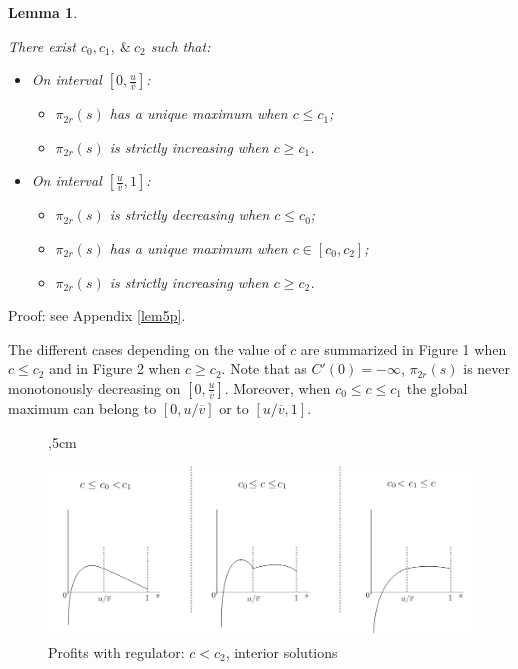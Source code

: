 \documentclass[a4paper,leqno]{article}%
\newtheorem{lemma}{Lemma}
\newcommand{\ov}{\overline{v}}
\begin{document}
\begin{lemma}~~\label{lem7}

There exist $c_0,c_1,~\&~c_2$ such that:

\begin{itemize}
    \item On interval $[0,\frac{u}{\ov}]$:
    \begin{itemize}
        \item $\pi_{2r}(s)$ has a unique maximum when $c\leq c_1$;
        \item $\pi_{2r}(s)$ is strictly increasing when $c\geq c_1$.
    \end{itemize}
    \item On interval $[\frac{u}{\ov},1]$:
    \begin{itemize}
        \item $\pi_{2r}(s)$ is strictly decreasing when $c\leq c_0$;
        \item $\pi_{2r}(s)$ has a unique maximum when $c\in[c_0,c_2]$;
        \item $\pi_{2r}(s)$ is strictly increasing when $c\geq c_2$.
    \end{itemize}
\end{itemize}

\end{lemma}

\noindent Proof: see Appendix \ref{lem5p}.

\noindent The different cases depending on the value of $c$ are summarized in Figure 1 when $c\leq c_2$ and in Figure 2 when $c\geq c_2$. Note that as $C'(0)=-\infty$, $\pi_{2r}(s)$ is never monotonously decreasing on $[0,\frac{u}{\ov}]$. Moreover, when $c_0\leq c\leq c_1$ the global maximum can belong to $[0,u/\ov]$ or to $[u/\ov,1]$. 

\medskip

\begin{figure}[H]
,5cm{
\includegraphics[scale=0.55]{Figure1}
\caption{Profits with regulator: $c<c_2$, interior solutions}\label{Figure1}}
\end{figure}
\end{document}
